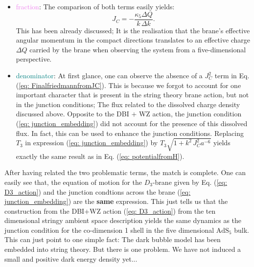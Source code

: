 \begin{itemize}
    \item \textcolor{violet}{fraction}: The comparison of both terms easily yields:
    \begin{equation}
        J_{C} = -\frac{\kappa_{5} \Delta Q}{ k \, \Delta k}. 
    \end{equation}
    This has been already discussed; It is the realisation that the brane's effective angular momentum in the compact directions translates to an effective charge $\Delta Q$ carried by the brane when observing the system from a five-dimensional perspective.
    \item \textcolor{teal}{denominator}: At first glance, one can observe the absence of a $J_{C}^{2}$ term in Eq. (\ref{eq: FinalfriedmannfromJC}). This is because we forgot to account for one important character that is present in the string theory brane action, but not in the junction conditions; The flux related to the dissolved charge density discussed above. Opposite to the DBI $+$ WZ action, the junction condition (\ref{eq: junction_embedding}) did not account for the presence of this dissolved flux. In fact, this can be used to enhance the junction conditions. Replacing $T_{3}$ in expression (\ref{eq: junction_embedding}) by $T_{3}\sqrt{1 + k^{2}\, J_{C}^{2} a^{-6}}$ yields exactly the same result as in Eq. (\ref{eq: potentialfromH}).
\end{itemize}
After having related the two problematic terms, the match is complete. One can easily see that, the equation of motion for the $D_{3}$-brane given by Eq. (\ref{eq: D3_action}) and the junction condtions across the brane (\ref{eq: junction_embedding}) are the \textbf{same} expression. This just tells us that the construction from the DBI$+$WZ action (\ref{eq: D3_action}) from the ten dimensional stringy ambient space description yields the same dynamics as the junction condition for the co-dimension 1 shell in the five dimensional $\text{AdS}_{5}$ bulk. This can just point to one simple fact: The dark bubble model has been embedded into string theory. But there is one problem. We have not induced a small and positive dark energy density yet...

